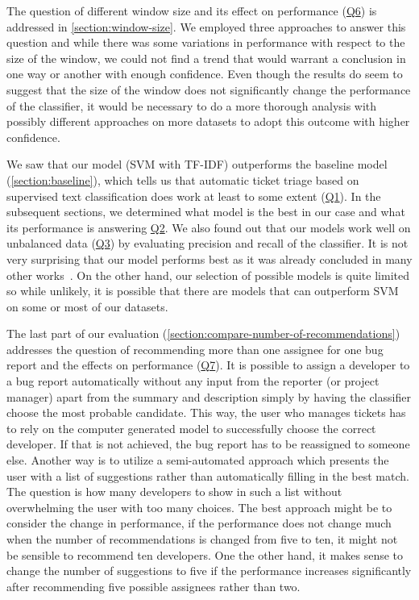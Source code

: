 The question of different window size and its effect on performance (\hyperlink{question:6}{Q6}) is addressed in \autoref{section:window-size}. We employed three approaches to answer this question and while there was some variations in performance with respect to the size of the window, we could not find a trend that would warrant a conclusion in one way or another with enough confidence. Even though the results do seem to suggest that the size of the window does not significantly change the performance of the classifier, it would be necessary to do a more thorough analysis with possibly different approaches on more datasets to adopt this outcome with higher confidence.

We saw that our model (SVM with TF-IDF) outperforms the baseline model (\autoref{section:baseline}), which tells us that automatic ticket triage based on supervised text classification does work at least to some extent (\hyperlink{question:1}{Q1}). In the subsequent sections, we determined what model is the best in our case and what its performance is answering \hyperlink{question:2}{Q2}. We also found out that our models work well on unbalanced data (\hyperlink{question:3}{Q3}) by evaluating precision and recall of the classifier. It is not very surprising that our model performs best as it was already concluded in many other works~\cite{Anvik2006}\cite{Ahsan2009}\cite{Somasundaram2012}. On the other hand, our selection of possible models is quite limited so while unlikely, it is possible that there are models that can outperform SVM on some or most of our datasets.

The last part of our evaluation (\autoref{section:compare-number-of-recommendations}) addresses the question of recommending more than one assignee for one bug report and the effects on performance (\hyperlink{question:7}{Q7}). It is possible to assign a developer to a bug report automatically without any input from the reporter (or project manager) apart from the summary and description simply by having the classifier choose the most probable candidate. This way, the user who manages tickets has to rely on the computer generated model to successfully choose the correct developer. If that is not achieved, the bug report has to be reassigned to someone else. Another way is to utilize a semi-automated approach which presents the user with a list of suggestions rather than automatically filling in the best match. The question is how many developers to show in such a list without overwhelming the user with too many choices. The best approach might be to consider the change in performance, if the performance does not change much when the number of recommendations is changed from five to ten, it might not be sensible to recommend ten developers. One the other hand, it makes sense to change the number of suggestions to five if the performance increases significantly after recommending five possible assignees rather than two.

